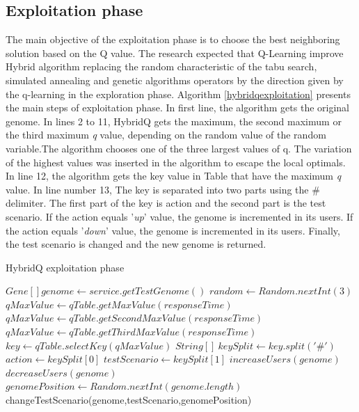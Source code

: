 \documentclass{report}
\begin{document}
\subsection{Exploitation phase}

The main objective of the exploitation phase is to choose the best neighboring solution based on the Q value. The research expected that Q-Learning improve Hybrid algorithm replacing the random characteristic of the tabu search, simulated  annealing and genetic algorithms operators by the direction given by the q-learning in the exploration phase. Algorithm \ref{hybridqexploitation} presents the main steps of exploitation phase. In first line, the algorithm gets the original genome. In lines 2 to 11, HybridQ gets the maximum, the second maximum or the third maximum \textit{q} value, depending on the random value of the random variable.The algorithm chooses one of the three largest values of q. The variation of the highest values was inserted in the algorithm to escape the local optimals. In line 12, the algorithm gets the key value in Table that have the maximum \textit{q} value. In line number 13, The key is separated into two parts using the \# delimiter. The first part of the key is action and the second part is the test scenario. If the action equals '\textit{up}' value, the genome is incremented in its users. If the action equals '\textit{down}' value, the genome is incremented in its users. Finally, the test scenario is changed and the new genome is returned.




\begin{algorithm}[h]
  \caption{HybridQ exploitation phase }\label{hybridqexploitation}
  \begin{algorithmic}[1]    
    \State $Gene[] genome \gets service.getTestGenome()$
    \State $random \gets Random.nextInt(3)$
    \State $qMaxValue \gets qTable.getMaxValue(responseTime)$
    \EndIf
    \State $qMaxValue \gets qTable.getSecondMaxValue(responseTime)$
    \EndIf
    \State $qMaxValue \gets qTable.getThirdMaxValue(responseTime)$
    \EndIf
    \State $key \gets qTable.selectKey(qMaxValue)$
    \State $String[]\  keySplit \gets key.split('\#')$ 
    \State $action \gets keySplit[0]$
    \State $testScenario \gets keySplit[1]$   
    \State $ increaseUsers(genome) $
    \EndIf
    \State $ decreaseUsers(genome) $
    \EndIf    
    \State $genomePosition \gets Random.nextInt(genome.length)$
    \State changeTestScenario(genome,testScenario,genomePosition)
  \end{algorithmic}
\end{algorithm}
\end{document}
